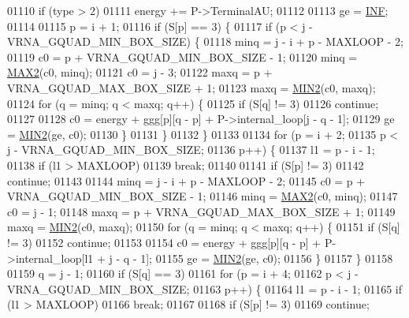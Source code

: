 \begin{DoxyCode}
01110   \textcolor{keywordflow}{if} (type > 2)
01111     energy += P->TerminalAU;
01112 
01113   ge = \hyperlink{energy__const_8h_a12c2040f25d8e3a7b9e1c2024c618cb6}{INF};
01114 
01115   p = i + 1;
01116   \textcolor{keywordflow}{if} (S[p] == 3) \{
01117     \textcolor{keywordflow}{if} (p < j - VRNA\_GQUAD\_MIN\_BOX\_SIZE) \{
01118       minq  = j - i + p - MAXLOOP - 2;
01119       c0    = p + VRNA\_GQUAD\_MIN\_BOX\_SIZE - 1;
01120       minq  = \hyperlink{group__utils_ga33297b3679c713b0c4d897cd0fe3b122}{MAX2}(c0, minq);
01121       c0    = j - 3;
01122       maxq  = p + VRNA\_GQUAD\_MAX\_BOX\_SIZE + 1;
01123       maxq  = \hyperlink{group__utils_gae0b9cd0ce090bd69b951aa73e8fa4f7d}{MIN2}(c0, maxq);
01124       \textcolor{keywordflow}{for} (q = minq; q < maxq; q++) \{
01125         \textcolor{keywordflow}{if} (S[q] != 3)
01126           \textcolor{keywordflow}{continue};
01127 
01128         c0  = energy + ggg[p][q - p] + P->internal\_loop[j - q - 1];
01129         ge  = \hyperlink{group__utils_gae0b9cd0ce090bd69b951aa73e8fa4f7d}{MIN2}(ge, c0);
01130       \}
01131     \}
01132   \}
01133 
01134   \textcolor{keywordflow}{for} (p = i + 2;
01135        p < j - VRNA\_GQUAD\_MIN\_BOX\_SIZE;
01136        p++) \{
01137     l1 = p - i - 1;
01138     \textcolor{keywordflow}{if} (l1 > MAXLOOP)
01139       \textcolor{keywordflow}{break};
01140 
01141     \textcolor{keywordflow}{if} (S[p] != 3)
01142       \textcolor{keywordflow}{continue};
01143 
01144     minq  = j - i + p - MAXLOOP - 2;
01145     c0    = p + VRNA\_GQUAD\_MIN\_BOX\_SIZE - 1;
01146     minq  = \hyperlink{group__utils_ga33297b3679c713b0c4d897cd0fe3b122}{MAX2}(c0, minq);
01147     c0    = j - 1;
01148     maxq  = p + VRNA\_GQUAD\_MAX\_BOX\_SIZE + 1;
01149     maxq  = \hyperlink{group__utils_gae0b9cd0ce090bd69b951aa73e8fa4f7d}{MIN2}(c0, maxq);
01150     \textcolor{keywordflow}{for} (q = minq; q < maxq; q++) \{
01151       \textcolor{keywordflow}{if} (S[q] != 3)
01152         \textcolor{keywordflow}{continue};
01153 
01154       c0  = energy + ggg[p][q - p] + P->internal\_loop[l1 + j - q - 1];
01155       ge  = \hyperlink{group__utils_gae0b9cd0ce090bd69b951aa73e8fa4f7d}{MIN2}(ge, c0);
01156     \}
01157   \}
01158 
01159   q = j - 1;
01160   \textcolor{keywordflow}{if} (S[q] == 3)
01161     \textcolor{keywordflow}{for} (p = i + 4;
01162          p < j - VRNA\_GQUAD\_MIN\_BOX\_SIZE;
01163          p++) \{
01164       l1 = p - i - 1;
01165       \textcolor{keywordflow}{if} (l1 > MAXLOOP)
01166         \textcolor{keywordflow}{break};
01167 
01168       \textcolor{keywordflow}{if} (S[p] != 3)
01169         \textcolor{keywordflow}{continue};

\end{DoxyCode}
